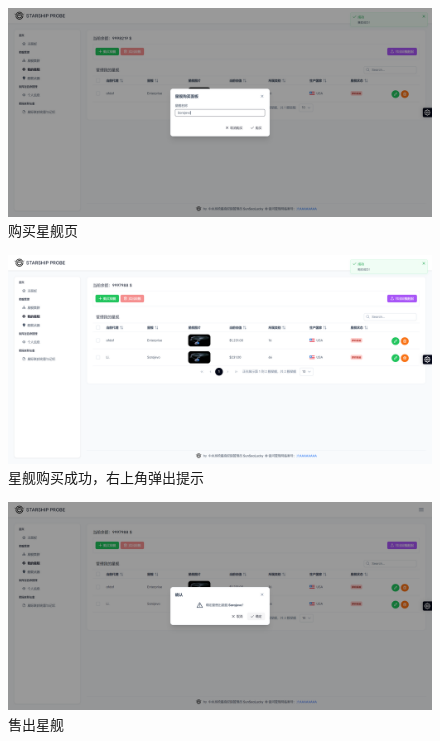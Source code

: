 \documentclass{base}
\begin{document}
\begin{figure}[H]
	\centering
	\includegraphics[width=\linewidth]{images/BuyStarship}
	\caption{购买星舰页}
	\label{fig:buystarship}
\end{figure}


\begin{figure}[H]
	\centering
	\includegraphics[width=\linewidth]{images/BuyStarshipSuccess}
	\caption{星舰购买成功，右上角弹出提示}
	\label{fig:buystarshipsuccess}
\end{figure}

\begin{figure}[H]
	\centering
	\includegraphics[width=\linewidth]{images/SaleStarship}
	\caption{售出星舰}
	\label{fig:salestarship}
\end{figure}
\end{document}

